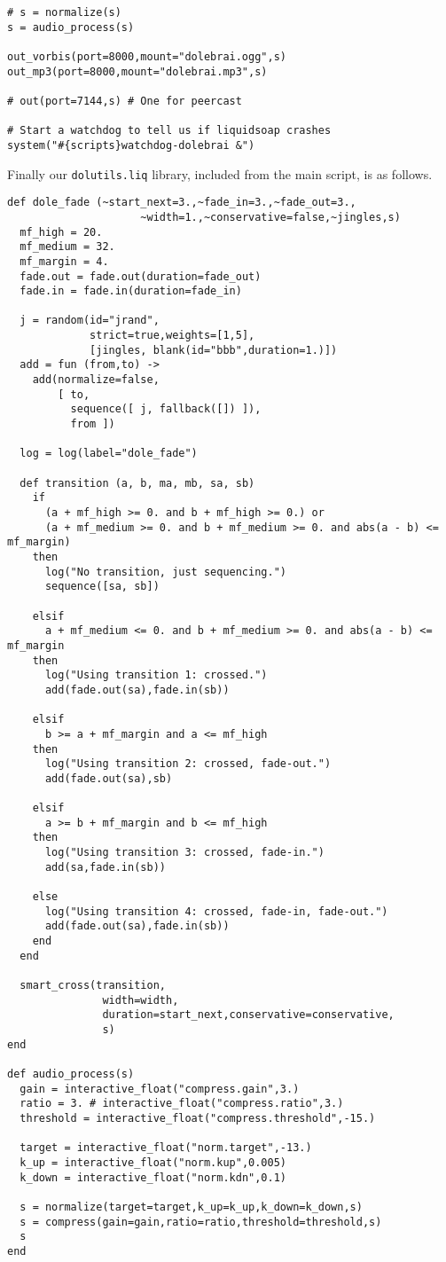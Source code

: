\begin{verbatim}
# s = normalize(s)
s = audio_process(s)

out_vorbis(port=8000,mount="dolebrai.ogg",s)
out_mp3(port=8000,mount="dolebrai.mp3",s)

# out(port=7144,s) # One for peercast

# Start a watchdog to tell us if liquidsoap crashes
system("#{scripts}watchdog-dolebrai &")
\end{verbatim}
Finally our \verb+dolutils.liq+ library, included from the main script, 
is as follows.

\begin{verbatim}
def dole_fade (~start_next=3.,~fade_in=3.,~fade_out=3.,
                     ~width=1.,~conservative=false,~jingles,s)
  mf_high = 20.
  mf_medium = 32.
  mf_margin = 4.
  fade.out = fade.out(duration=fade_out)
  fade.in = fade.in(duration=fade_in)

  j = random(id="jrand",
             strict=true,weights=[1,5],
             [jingles, blank(id="bbb",duration=1.)])
  add = fun (from,to) ->
    add(normalize=false,
        [ to,
          sequence([ j, fallback([]) ]),
          from ])

  log = log(label="dole_fade")

  def transition (a, b, ma, mb, sa, sb)
    if
      (a + mf_high >= 0. and b + mf_high >= 0.) or
      (a + mf_medium >= 0. and b + mf_medium >= 0. and abs(a - b) <= mf_margin)
    then
      log("No transition, just sequencing.")
      sequence([sa, sb])

    elsif
      a + mf_medium <= 0. and b + mf_medium >= 0. and abs(a - b) <= mf_margin
    then
      log("Using transition 1: crossed.")
      add(fade.out(sa),fade.in(sb))

    elsif
      b >= a + mf_margin and a <= mf_high
    then
      log("Using transition 2: crossed, fade-out.")
      add(fade.out(sa),sb)

    elsif
      a >= b + mf_margin and b <= mf_high
    then
      log("Using transition 3: crossed, fade-in.")
      add(sa,fade.in(sb))

    else
      log("Using transition 4: crossed, fade-in, fade-out.")
      add(fade.out(sa),fade.in(sb))
    end
  end

  smart_cross(transition,
               width=width,
               duration=start_next,conservative=conservative,
               s)
end

def audio_process(s)
  gain = interactive_float("compress.gain",3.)
  ratio = 3. # interactive_float("compress.ratio",3.)
  threshold = interactive_float("compress.threshold",-15.)

  target = interactive_float("norm.target",-13.)
  k_up = interactive_float("norm.kup",0.005)
  k_down = interactive_float("norm.kdn",0.1)

  s = normalize(target=target,k_up=k_up,k_down=k_down,s)
  s = compress(gain=gain,ratio=ratio,threshold=threshold,s)
  s
end
\end{verbatim}
